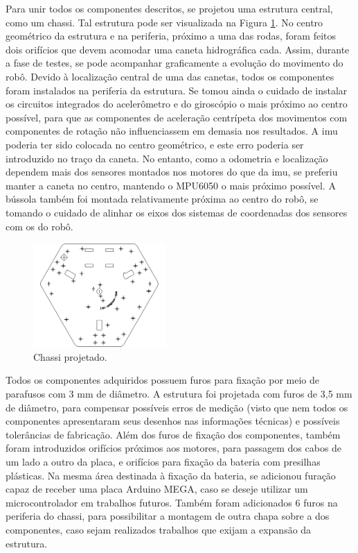 Para unir todos os componentes descritos, se projetou uma estrutura central, como um chassi. Tal estrutura pode ser visualizada na Figura \ref{fig:chassi}. No centro geométrico da estrutura e na periferia, próximo a uma das rodas, foram feitos dois orifícios que devem acomodar uma caneta hidrográfica cada. Assim, durante a fase de testes, se pode acompanhar graficamente a evolução do movimento do robô. Devido à localização central de uma das canetas, todos os componentes foram instalados na periferia da estrutura. Se tomou ainda o cuidado de instalar os circuitos integrados do acelerômetro e do giroscópio o mais próximo ao centro possível, para que as componentes de aceleração centrípeta dos movimentos com componentes de rotação não influenciassem em demasia nos resultados. A \acrshort{imu} poderia ter sido colocada no centro geométrico, e este erro poderia ser introduzido no traço da caneta. No entanto, como a odometria e localização dependem mais dos sensores montados nos motores do que da \acrshort{imu}, se preferiu manter a caneta no centro, mantendo o MPU6050 o mais próximo possível. A bússola também foi montada relativamente próxima ao centro do robô, se tomando o cuidado de alinhar os eixos dos sistemas de coordenadas dos sensores com os do robô.

\begin{figure}[h]
  \centering
  \includegraphics[width = 0.45\textwidth]{imagens/chassidxf}
  \caption{Chassi projetado.}
  \label{fig:chassi}
\end{figure}

Todos os componentes adquiridos possuem furos para fixação por meio de parafusos com 3 mm de diâmetro. A estrutura foi projetada com furos de 3,5 mm de diâmetro, para compensar possíveis erros de medição (visto que nem todos os componentes apresentaram seus desenhos nas informações técnicas) e possíveis tolerâncias de fabricação. Além dos furos de fixação dos componentes, também foram introduzidos orifícios próximos aos motores, para passagem dos cabos de um lado a outro da placa, e orifícios para fixação da bateria com presilhas plásticas. Na mesma área destinada à fixação da bateria, se adicionou furação capaz de receber uma placa Arduino MEGA, caso se deseje utilizar um microcontrolador em trabalhos futuros. Também foram adicionados 6 furos na periferia do chassi, para possibilitar a montagem de outra chapa sobre a dos componentes, caso sejam realizados trabalhos que exijam a expansão da estrutura.

